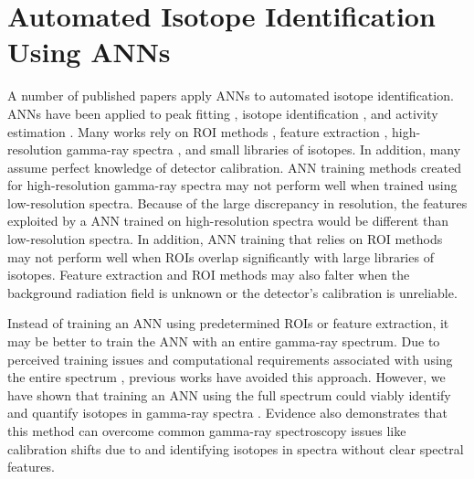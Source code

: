 \section{Automated Isotope Identification Using ANNs}

A number of published papers apply ANNs to automated isotope identification. ANNs have been applied to peak fitting \cite{Abdel-Aal2002}, isotope identification \cite{Abdel-Aal1996, Medhat2012}, and activity estimation \cite{Abdel-Aal1996, Vigneron1996}. Many works rely on ROI methods \cite{Pilato1999}, feature extraction \cite{Chen2009}, high-resolution gamma-ray spectra \cite{Yoshida2002}, and small libraries of isotopes. In addition, many assume perfect knowledge of detector calibration. ANN training methods created for high-resolution gamma-ray spectra may not perform well when trained using low-resolution spectra. Because of the large discrepancy in resolution, the features exploited by a ANN trained on high-resolution spectra would be different than low-resolution spectra. In addition, ANN training that relies on ROI methods may not perform well when ROIs overlap significantly with large libraries of isotopes. Feature extraction and ROI methods may also falter when the background radiation field is unknown or the detector's calibration is unreliable.  

Instead of training an ANN using predetermined ROIs or feature extraction, it may be better to train the ANN with an entire gamma-ray spectrum. Due to perceived training issues and computational requirements associated with using the entire spectrum \cite{Pilato1999,Yoshida2002}, previous works have avoided this approach. However, we have shown that training an ANN using the full spectrum could viably identify and quantify isotopes in gamma-ray spectra \cite{kamuda2017,kamudaThesis2017,kamuda2018}. Evidence also demonstrates that this method can overcome common gamma-ray spectroscopy issues like calibration shifts due to and identifying isotopes in spectra without clear spectral features.


